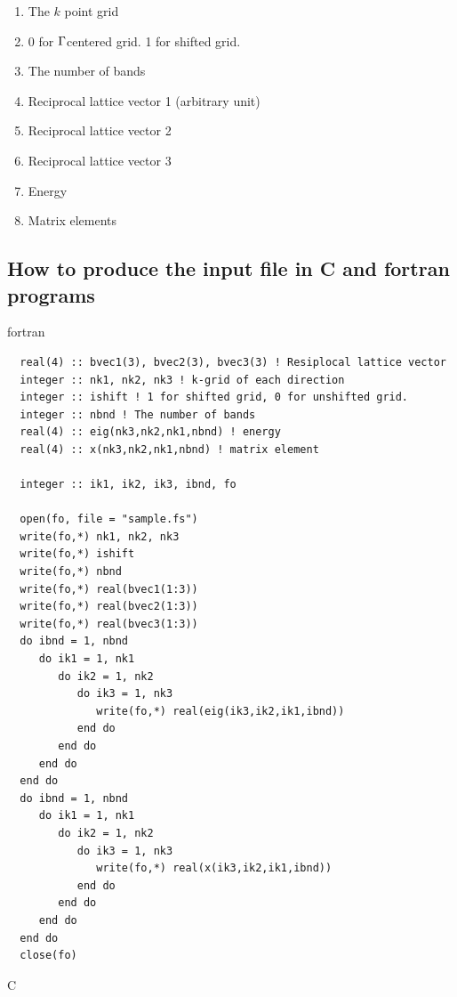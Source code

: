 \documentclass[12pt]{article}
\begin{document}
\begin{enumerate}
  \renewcommand{\labelenumi}{(\arabic{enumi})}
  \item The $k$ point grid
  \item 0 for ${\rm \Gamma}$centered grid. 1 for shifted grid.
  \item The number of bands
  \item Reciprocal lattice vector 1 (arbitrary unit)
  \item Reciprocal lattice vector 2
  \item Reciprocal lattice vector 3
  \item Energy
  \item Matrix elements
\end{enumerate}

\subsection{How to produce the input file in C and fortran programs}

fortran

\begin{verbatim}
  real(4) :: bvec1(3), bvec2(3), bvec3(3) ! Resiplocal lattice vector
  integer :: nk1, nk2, nk3 ! k-grid of each direction
  integer :: ishift ! 1 for shifted grid, 0 for unshifted grid.
  integer :: nbnd ! The number of bands
  real(4) :: eig(nk3,nk2,nk1,nbnd) ! energy
  real(4) :: x(nk3,nk2,nk1,nbnd) ! matrix element

  integer :: ik1, ik2, ik3, ibnd, fo

  open(fo, file = "sample.fs")
  write(fo,*) nk1, nk2, nk3
  write(fo,*) ishift
  write(fo,*) nbnd
  write(fo,*) real(bvec1(1:3))
  write(fo,*) real(bvec2(1:3))
  write(fo,*) real(bvec3(1:3))
  do ibnd = 1, nbnd
     do ik1 = 1, nk1
        do ik2 = 1, nk2
           do ik3 = 1, nk3
              write(fo,*) real(eig(ik3,ik2,ik1,ibnd)) 
           end do
        end do
     end do
  end do
  do ibnd = 1, nbnd
     do ik1 = 1, nk1
        do ik2 = 1, nk2
           do ik3 = 1, nk3
              write(fo,*) real(x(ik3,ik2,ik1,ibnd)) 
           end do
        end do
     end do
  end do
  close(fo)
\end{verbatim}

C
\end{document}
